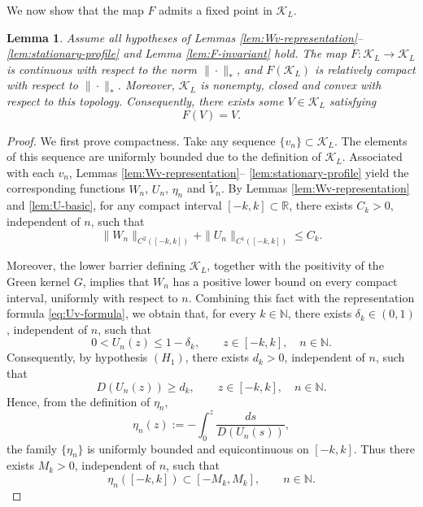 \documentclass[preprint,sort&compress,final,12pt]{elsarticle}
\newtheorem{lemma}[theorem]{Lemma}
\numberwithin{equation}{section}
\begin{document}
We now show that the map $F$ admits a fixed point in $\mathcal K_L$.

\begin{lemma}\label{lem:F-compact-continuous}
Assume all hypotheses of Lemmas \ref{lem:Wv-representation}--\ref{lem:stationary-profile} and Lemma \ref{lem:F-invariant} hold.
The map $F:\mathcal K_L\to\mathcal K_L$ is continuous with respect to the norm $\|\cdot\|_*$, and $F(\mathcal K_L)$ is relatively compact with respect to $\|\cdot\|_*$. Moreover, $\mathcal K_L$ is nonempty, closed and convex with respect to this topology.
Consequently, there exists some $V\in\mathcal K_L$ satisfying
\begin{equation*}
F(V)=V.
\end{equation*}
\end{lemma}

\begin{proof}
We first prove compactness. Take any sequence $\{v_n\}\subset\mathcal K_L$. The elements of this sequence are uniformly bounded due to the definition of $\mathcal K_L$. Associated with each $v_n$, Lemmas 
\ref{lem:Wv-representation}--
\ref{lem:stationary-profile} yield the corresponding functions $W_n$, $U_n$, $\eta_n$ and $\widetilde V_n$. By Lemmas \ref{lem:Wv-representation} and \ref{lem:U-basic}, for any compact interval $[-k,k]\subset\mathbb R$, there exists $C_k>0$, independent of $n$, such that
\begin{equation*}
\|W_n\|_{C^2([-k,k])}+\|U_n\|_{C^1([-k,k])}\le C_k.
\end{equation*}

Moreover, the lower barrier defining $\mathcal K_L$, together with the positivity of the Green kernel $G$, implies that $W_n$ has a positive lower bound on every compact interval, uniformly with respect to $n$. Combining this fact with the representation formula \eqref{eq:Uv-formula}, we obtain that, for every $k\in\mathbb N$, there exists $\delta_k\in(0,1)$, independent of $n$, such that
\begin{equation*}
0<U_n(z)\le 1-\delta_k,\qquad z\in[-k,k],\quad n\in\mathbb N.
\end{equation*}
Consequently, by hypothesis $(H_1)$, there exists $d_k>0$, independent of $n$, such that
\begin{equation*}
D(U_n(z))\ge d_k,\qquad z\in[-k,k],\quad n\in\mathbb N.
\end{equation*}
Hence, from the definition of $\eta_n$,
\begin{equation*}
\eta_n(z):=-\int_0^z\frac{ds}{D(U_n(s))},
\end{equation*}
the family $\{\eta_n\}$ is uniformly bounded and equicontinuous on $[-k,k]$. Thus there exists $M_k>0$, independent of $n$, such that
\begin{equation*}
\eta_n([-k,k])\subset[-M_k,M_k],\qquad n\in\mathbb N.
\end{equation*}


\end{proof}
\end{document}
